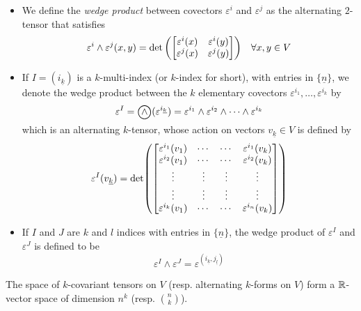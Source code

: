 \documentclass[../main-v2-manifolds.tex]{subfiles}
\begin{document}
\begin{itemize}
    \item We define the \emph{wedge product} between covectors $\varepsilon^i$ and $\varepsilon^j$ as the alternating $2$-tensor that satisfies
    \[
        \varepsilon^i\wedge \varepsilon^j(x,y) = \det\qty(\mqty[\varepsilon^i(x) & \varepsilon^i(y) \\ \varepsilon^j(x) & \varepsilon^j(y)])\quad \forall x,y\in V
    \]
    \item If $I = (i_{\underline{k}})$ is a $k$-multi-index (or $k$-index for short), with entries in $\{\underline{n}\}$, we denote the wedge product between the $k$ elementary covectors $\varepsilon^{i_1},\ldots, \varepsilon^{i_k}$ by
    \[
        \varepsilon^I = \bigowedge(\varepsilon^{i_{\underline{k}}}) = \varepsilon^{i_1}\wedge \varepsilon^{i_2}\wedge\cdots\wedge \varepsilon^{i_k}
    \]
    which is an alternating $k$-tensor, whose action on vectors $v_{\underline{k}}\in V$ is defined by
    \[
        \varepsilon^I(v_{\underline{k}}) = \det(\mqty[\varepsilon^{i_1}(v_1) & \cdots &\cdots &\varepsilon^{i_1}(v_k) \\ \varepsilon^{i_2}(v_1) & \cdots &\cdots &\varepsilon^{i_2}(v_k) \\ \vdots & \vdots & \vdots & \vdots \\ \vdots & \vdots & \vdots & \vdots \\ \varepsilon^{i_k}(v_1) & \cdots & \cdots & \varepsilon^{i_n}(v_k)])
    \]
    \item  If $I$ and $J$ are $k$ and $l$ indices with entries in $\{\underline{n}\}$, the wedge product of $\varepsilon^I$ and $\varepsilon^J$ is defined to be 
    \[
        \varepsilon^I\wedge\varepsilon^J = \varepsilon^{(i_{\underline{k}}, j_{\underline{l}})}
    \]
\end{itemize}
The space of $k$-covariant tensors on $V$ (resp. alternating $k$-forms on $V$) form a $\mathbb{R}$-vector space of dimension $n^k$ (resp. $\binom{n}{k}$). 
\end{document}
